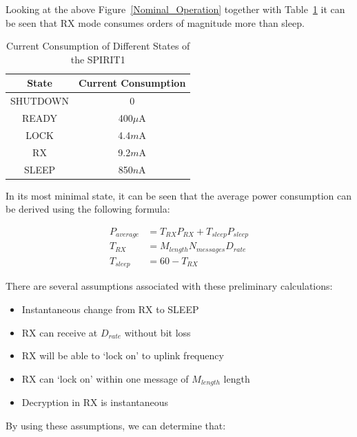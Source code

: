 \documentclass[12pt, twoside]{report}
\begin{document}
\par Looking at the above Figure~\ref{Nominal_Operation} together with Table~\ref{tab:power_table} it can be seen that RX mode consumes orders of magnitude more than sleep.

\begin{table}[h]
    \centering
    \begin{tabular}{c c}
         State & Current Consumption \\
         \toprule
         SHUTDOWN & 0 \\
         READY & 400$\mu$A \\
         LOCK & 4.4$m$A \\
         RX & 9.2$m$A \\
         SLEEP & 850$n$A
    \end{tabular}
    \caption{Current Consumption of Different States of the SPIRIT1}
\label{tab:power_table}
\end{table}

In its most minimal state, it can be seen that the average power consumption can be derived using the following formula:

\begin{equation} \label{eq:power_consumption}
    \begin{split}
    P_{average} &= T_{RX}P_{RX} + T_{sleep}P_{sleep} \\
    T_{RX} &= M_{length}N_{messages}D_{rate} \\
    T_{sleep} &= 60-T_{RX}
    \end{split}
\end{equation}

\par There are several assumptions associated with these preliminary calculations:

\begin{itemize}[noitemsep]
\item Instantaneous change from RX to SLEEP
\item RX can receive at $D_{rate}$ without bit loss
\item RX will be able to `lock on' to uplink frequency
\item RX can `lock on' within one message of $M_{length}$ length
\item Decryption in RX is instantaneous
\end{itemize}

\par By using these assumptions, we can determine that:
\end{document}
